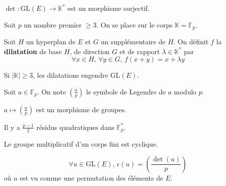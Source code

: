 
  \begin{proposition}
    $\det : \mathrm{GL}(E) \rightarrow \mathbb{K}^*$ est un morphisme surjectif.
  \end{proposition}


  Soit $p$ un nombre premier $\geq 3$. On se place sur le corps $\mathbb{K} = \mathbb{F}_p$.

  \begin{definition}
    Soit $H$ un hyperplan de $E$ et $G$ un supplémentaire de $H$. On définit $f$ la \textbf{dilatation} de base $H$, de direction $G$ et de rapport $\lambda \in \mathbb{K}^*$ par
    \[ \forall x \in H, \, \forall y \in G, \, f(x+y) = x + \lambda y \]
  \end{definition}

  \begin{theorem}
    Si $|\mathbb{K}| \geq 3$, les dilatations engendre $\mathrm{GL}(E)$.
  \end{theorem}

  \begin{notation}
    Soit $a \in \mathbb{F}_p$. On note $\left( \frac{a}{p} \right)$ le symbole de Legendre de $a$ modulo $p$.
  \end{notation}

  \begin{lemma}
    $a \mapsto \left( \frac{a}{p} \right)$ est un morphisme de groupes.
  \end{lemma}

  \begin{lemma}
    Il y a $\frac{p-1}{2}$ résidus quadratiques dans $\mathbb{F}_p^*$.
  \end{lemma}

  \begin{theorem}
    Le groupe multiplicatif d'un corps fini est cyclique.
  \end{theorem}


  \begin{theorem}
    \[ \forall u \in \mathrm{GL}(E), \, \epsilon(u) = \left( \frac{\det(u)}{p} \right) \]
    où $u$ est vu comme une permutation des éléments de $E$.
  \end{theorem}

  \annexessection


